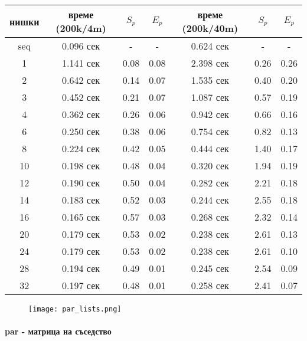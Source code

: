 \begin{center}
\begin{tabular}{ c | c c c | c c c | }
  нишки & време (200k/4m) & $S_p$ & $E_p$ & време (200k/40m) & $S_p$ & $E_p$ \\
  \hline
  seq & 0.096 сек & - & - & 0.624 сек & - & - \\
  1  & 1.141 сек & 0.08 & 0.08 & 2.398 сек & 0.26 & 0.26 \\
  2  & 0.642 сек & 0.14 & 0.07 & 1.535 сек & 0.40 & 0.20 \\
  3  & 0.452 сек & 0.21 & 0.07 & 1.087 сек & 0.57 & 0.19 \\
  4  & 0.362 сек & 0.26 & 0.06 & 0.942 сек & 0.66 & 0.16 \\
  6  & 0.250 сек & 0.38 & 0.06 & 0.754 сек & 0.82 & 0.13 \\
  8  & 0.224 сек & 0.42 & 0.05 & 0.444 сек & 1.40 & 0.17 \\
  10 & 0.198 сек & 0.48 & 0.04 & 0.320 сек & 1.94 & 0.19 \\
  12 & 0.190 сек & 0.50 & 0.04 & 0.282 сек & 2.21 & 0.18 \\
  14 & 0.183 сек & 0.52 & 0.03 & 0.244 сек & 2.55 & 0.18 \\
  16 & 0.165 сек & 0.57 & 0.03 & 0.268 сек & 2.32 & 0.14 \\
  20 & 0.179 сек & 0.53 & 0.02 & 0.238 сек & 2.61 & 0.13 \\
  24 & 0.179 сек & 0.53 & 0.02 & 0.238 сек & 2.61 & 0.10 \\
  28 & 0.194 сек & 0.49 & 0.01 & 0.245 сек & 2.54 & 0.09 \\
  32 & 0.197 сек & 0.48 & 0.01 & 0.258 сек & 2.41 & 0.07 \\
\end{tabular}
\end{center}

\begin{figure}[H]
  \centering
  \texttt{[image: par\_lists.png]}
\end{figure}

\paragraph*{par - матрица на съседство}

